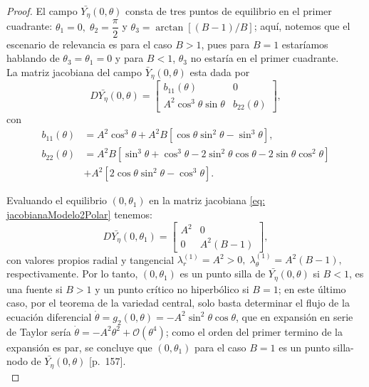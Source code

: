 \documentclass[]{article}
\theoremstyle{remark}
\begin{document}
\begin{proof}
		\noindent El campo $\bar{Y_{\eta}}(0,\theta)$ consta de tres puntos de equilibrio en el primer cuadrante: $\theta_1 = 0, \; \theta_2 = \dfrac{\pi}{2}$ y $\theta_3 = \arctan[(B-1)/B]$; aquí, notemos que el escenario de relevancia es para el caso $B>1$, pues para $B=1$ estaríamos hablando de $\theta_3 = \theta_1 = 0$ y para $B<1$, $\theta_3$ no estaría en el primer cuadrante.\\
		La matriz jacobiana del campo $\bar{Y}_{\eta}(0,\theta)$ esta dada por
		\begin{equation}
			D\bar{Y_{\eta}}(0,\theta) =
			\begin{bmatrix}
				b_{11}(\theta)  & 0\\
				A^{2}\cos^{3}\theta\sin\theta & b_{22}(\theta)
			\end{bmatrix},
			\label{eq: jacobianaModelo2Polar}
		\end{equation}
		con
		\begin{equation*}
			\begin{aligned}
				b_{11}(\theta) &= A^{2}\cos^{3}\theta + A^{2}B[\cos\theta\sin^{2}\theta - \sin^{3}\theta], \\
				b_{22}(\theta) &= A^{2}B[\sin^{3}\theta + \cos^{3}\theta - 2\sin^{2}\theta\cos\theta - 2\sin\theta\cos^{2}\theta] \\
				&+ A^{2}[2\cos\theta\sin^{2}\theta - \cos^{3}\theta].
			\end{aligned}
		\end{equation*}
		
		\noindent Evaluando el equilibrio $(0,\theta_1)$ en la matriz jacobiana \eqref{eq: jacobianaModelo2Polar} tenemos:
		\begin{equation*}
			D\bar{Y_{\eta}}(0,\theta_1) =
			\begin{bmatrix}
				A^{2}  & 0 \\
				0 & A^{2}(B-1)
			\end{bmatrix},
		\end{equation*}
		con valores propios radial y tangencial $\lambda_r^{(1)} = A^{2}>0, \; \lambda_\theta^{(1)} = A^{2}(B-1),$ respectivamente. Por lo tanto, $(0, \theta_1)$ es un punto silla de $\bar{Y_{\eta}}(0,\theta)$ si $B<1$, es una fuente si $B>1$ y un punto crítico no hiperbólico si $B=1$; en este último caso, por el teorema de la variedad central, solo basta determinar el flujo de la ecuación diferencial $\dot{\theta} = g_2(0, \theta) = - A^2 \sin ^2 \theta \cos \theta$, que en expansión en serie de Taylor sería $\dot{\theta} = -A^2 \theta^2 + \mathcal{O}(\theta^ 4)$; como el orden del primer termino de la expansión es par, se concluye que $(0, \theta_1)$ para el caso $B=1$ es un punto silla-nodo de $\bar{Y_{\eta}}(0,\theta)$ \cite{perko}[p.~157]. \\
		

\end{proof}
\end{document}

